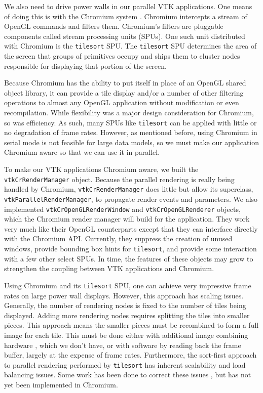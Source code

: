 \documentclass[twocolumn]{article}
\newcommand{\cidentifier}[1]{\texttt{#1}}
\begin{document}
  We also need to drive power walls in our parallel VTK applications.  One
  means of doing this is with the Chromium system \cite{Humphreys02}.
  Chromium intercepts a stream of OpenGL commands and filters them.
  Chromium's filters are pluggable components called stream processing
  units (SPUs).  One such unit distributed with Chromium is the
  \cidentifier{tile\-sort} SPU.  The \cidentifier{tile\-sort} SPU
  determines the area of the screen that groups of primitives occupy and
  ships them to cluster nodes responsible for displaying that portion of
  the screen.

  Because Chromium has the ability to put itself in place of an OpenGL
  shared object library, it can provide a tile display and/or a number of
  other filtering operations to almost any OpenGL application without
  modification or even recompilation.  While flexibility was a major design
  consideration for Chromium, so was efficiency.  As such, many SPUs like
  \cidentifier{tile\-sort} can be applied with little or no degradation of
  frame rates.  However, as mentioned before, using Chromium in serial mode
  is not feasible for large data models, so we must make our application
  Chromium aware so that we can use it in parallel.

  To make our VTK applications Chromium aware, we built the
  \cidentifier{vtk\-Cr\-Render\-Manager} object.  Because the parallel
  rendering is really being handled by Chromium,
  \cidentifier{vtk\-Cr\-Render\-Manager} does little but allow its
  superclass, \cidentifier{vtk\-Parallel\-Render\-Manager}, to propagate
  render events and parameters.  We also implemented
  \cidentifier{vtk\-Cr\-Open\-GL\-Render\-Window} and
  \cidentifier{vtk\-Cr\-Open\-GL\-Renderer} objects, which the Chromium
  render manager will build for the application.  They work very much like
  their OpenGL counterparts except that they can interface directly with
  the Chromium API.  Currently, they suppress the creation of unused
  windows, provide bounding box hints for \cidentifier{tile\-sort}, and
  provide some interaction with a few other select SPUs.  In time, the
  features of these objects may grow to strengthen the coupling between VTK
  applications and Chromium.

  Using Chromium and its \cidentifier{tile\-sort} SPU, one can achieve very
  impressive frame rates on large power wall displays.  However, this
  approach has scaling issues.  Generally, the number of rendering nodes is
  fixed to the number of tiles being displayed.  Adding more rendering
  nodes requires splitting the tiles into smaller pieces.  This approach
  means the smaller pieces must be recombined to form a full image for each
  tile.  This must be done either with additional image combining hardware
  \cite{Stoll01}, which we don't have, or with software by reading back the
  frame buffer, largely at the expense of frame rates.  Furthermore, the
  sort-first approach to parallel rendering performed by
  \cidentifier{tile\-sort} has inherent scalability and load balancing
  issues.  Some work has been done to correct these issues
  \cite{Samanta99}, but has not yet been implemented in Chromium.
\end{document}
